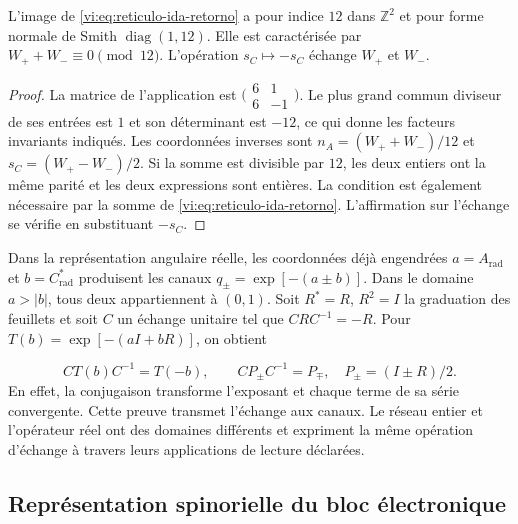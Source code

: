 \begin{proposition}
\label{vi:prop:indice-bidireccional}
L’image de \eqref{vi:eq:reticulo-ida-retorno} a pour indice $12$
dans $\mathbb Z^2$ et pour forme normale de Smith $\operatorname{diag}(1,12)$.
Elle est caractérisée par $W_++W_-\equiv0\pmod{12}$. L’opération
$s_C\mapsto-s_C$ échange $W_+$ et $W_-$.

\end{proposition}
\begin{proof}
La matrice de l'application est
$\bigl(\begin{smallmatrix}6&1\\6&-1\end{smallmatrix}\bigr)$.
Le plus grand commun diviseur de ses entrées est $1$ et son déterminant
est $-12$, ce qui donne les facteurs invariants indiqués. Les
coordonnées inverses sont
$n_A=(W_++W_-)/12$ et $s_C=(W_+-W_-)/2$.
Si la somme est divisible par $12$, les deux entiers ont la même
parité et les deux expressions sont entières. La condition est également
nécessaire par la somme de \eqref{vi:eq:reticulo-ida-retorno}.
L’affirmation sur l’échange se vérifie en substituant $-s_C$.

\end{proof}

Dans la représentation angulaire réelle, les coordonnées déjà engendrées
$a=A_{\mathrm{rad}}$ et $b=C^*_{\mathrm{rad}}$ produisent les
canaux $q_\pm=\exp[-(a\pm b)]$. Dans le domaine $a>|b|$, tous deux
appartiennent à $(0,1)$. Soit $R^*=R$, $R^2=I$ la graduation des
feuillets et soit $C$ un échange unitaire tel que $CRC^{-1}=-R$.
Pour $T(b)=\exp[-(aI+bR)]$, on obtient

\begin{equation}
 CT(b)C^{-1}=T(-b),\qquad
 CP_\pm C^{-1}=P_\mp,\quad P_\pm=(I\pm R)/2.
 \label{vi:eq:conjugacion-canales}
\end{equation}
En effet, la conjugaison transforme l’exposant et chaque terme
de sa série convergente. Cette preuve transmet l’échange aux
canaux. Le réseau entier et l’opérateur réel ont des domaines
différents et expriment la même opération d’échange à travers
leurs applications de lecture déclarées.


\subsection{Représentation spinorielle du bloc électronique
}
\label{vi:subsec:spin-electron}

